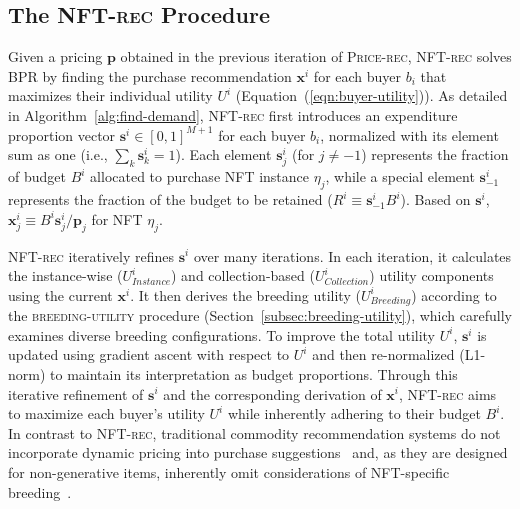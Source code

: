 \documentclass[conference]{IEEEtran}
\theoremstyle{plain}
\begin{document}
\subsection{The \textsc{NFT-rec}\xspace Procedure}
\label{subsec:method-user-demand}
    Given a pricing $\mathbf{p}$ obtained in the previous iteration of \textsc{Price-rec}\xspace, \textsc{NFT-rec}\xspace solves BPR\xspace by finding the purchase recommendation $\mathbf{x}^i$ for each buyer $b_i$ that maximizes their individual utility $U^i$ (Equation~(\ref{eqn:buyer-utility})). As detailed in Algorithm~\ref{alg:find-demand}, \textsc{NFT-rec}\xspace first introduces an expenditure proportion vector $\mathbf{s}^i\in [0,1]^{M+1}$ for each buyer $b_i$, normalized with its element sum as one (i.e., $\sum_k \mathbf{s}^i_k = 1$). Each element $\mathbf{s}^i_j$ (for $j \neq -1$) represents the fraction of budget $B^i$ allocated to purchase NFT instance $\eta_j$, while a special element $\mathbf{s}^i_{-1}$ represents the fraction of the budget to be retained ($R^i \equiv \mathbf{s}^i_{-1}B^i$). Based on $\mathbf{s}^i$,$\mathbf{x}^i_j \equiv B^i\mathbf{s}^i_j/\mathbf{p}_j$ for NFT $\eta_j$.

    \textsc{NFT-rec}\xspace iteratively refines $\mathbf{s}^i$ over many iterations. In each iteration, it calculates the instance-wise ($U^i_\textit{Instance}$) and collection-based ($U^i_\textit{Collection}$) utility components using the current $\mathbf{x}^i$. It then derives the breeding utility ($U^i_\textit{Breeding}$) according to the \textsc{breeding-utility} procedure (Section~\ref{subsec:breeding-utility}), which carefully examines diverse breeding configurations. To improve the total utility $U^i$, $\mathbf{s}^i$ is updated using gradient ascent with respect to $U^i$ and then re-normalized (L1-norm) to maintain its interpretation as budget proportions. Through this iterative refinement of $\mathbf{s}^i$ and the corresponding derivation of $\mathbf{x}^i$, \textsc{NFT-rec}\xspace aims to maximize each buyer's utility $U^i$ while inherently adhering to their budget $B^i$. In contrast to \textsc{NFT-rec}\xspace, traditional commodity recommendation systems do not incorporate dynamic pricing into purchase suggestions~\cite{he2020lightgcn, wang2019neural, zhang2019deep} and, as they are designed for non-generative items, inherently omit considerations of NFT-specific breeding~\cite{he2020lightgcn, wang2019neural, zhang2019deep, koren2009matrix, chen2019personalized}.
\end{document}
